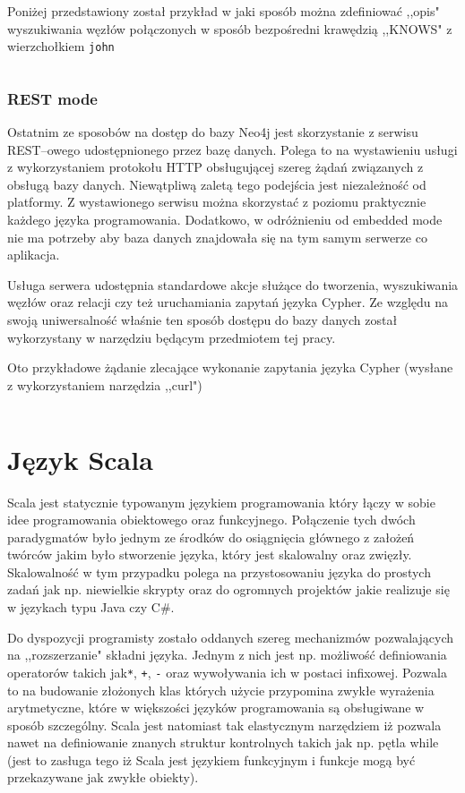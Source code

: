 \documentclass[brudnopis]{xmgr}
\begin{document}
Poniżej przedstawiony został przykład w jaki sposób można zdefiniować ,,opis" wyszukiwania węzłów połączonych w sposób bezpośredni krawędzią ,,KNOWS" z wierzchołkiem \texttt{john}

\inputminted{java}{listings/java/neo4j-traversal-api-knows.java}

\subsection{REST mode}

Ostatnim ze sposobów na dostęp do bazy Neo4j jest skorzystanie z serwisu REST--owego udostępnionego przez bazę danych. Polega to na wystawieniu usługi z wykorzystaniem protokołu HTTP obsługującej szereg żądań związanych z obsługą bazy danych. Niewątpliwą zaletą tego podejścia jest niezależność od platformy. Z wystawionego serwisu można skorzystać z poziomu praktycznie każdego języka programowania. Dodatkowo, w odróżnieniu od embedded mode nie ma potrzeby aby baza danych znajdowała się na tym samym serwerze co aplikacja.

Usługa serwera udostępnia standardowe akcje służące do tworzenia, wyszukiwania węzłów oraz relacji czy też uruchamiania zapytań języka Cypher. Ze względu na swoją uniwersalność właśnie ten sposób dostępu do bazy danych został wykorzystany w narzędziu będącym przedmiotem tej pracy.

Oto przykładowe żądanie zlecające wykonanie zapytania języka Cypher (wysłane z wykorzystaniem narzędzia ,,curl")

\inputminted{bash}{listings/bash/neo4j-rest-cypher.sh}

\chapter{Język Scala}

Scala jest statycznie typowanym językiem programowania który łączy w sobie idee programowania obiektowego oraz funkcyjnego. Połączenie tych dwóch paradygmatów było jednym ze środków do osiągnięcia głównego z założeń twórców jakim było stworzenie języka, który jest skalowalny oraz zwięzły. Skalowalność w tym przypadku polega na przystosowaniu języka do prostych zadań jak np. niewielkie skrypty oraz do ogromnych projektów jakie realizuje się w językach typu Java czy C\#.

Do dyspozycji programisty zostało oddanych szereg mechanizmów pozwalających na ,,rozszerzanie" składni języka. Jednym z nich jest np. możliwość definiowania operatorów takich jak\texttt{*}, \texttt{+}, \texttt{-} oraz wywoływania ich w postaci infixowej. Pozwala to na budowanie złożonych klas których użycie przypomina zwykłe wyrażenia arytmetyczne, które w większości języków programowania są obsługiwane w sposób szczególny. Scala jest natomiast tak elastycznym narzędziem iż pozwala nawet na definiowanie znanych struktur kontrolnych takich jak np. pętla while (jest to zasługa tego iż Scala jest językiem funkcyjnym i funkcje mogą być przekazywane jak zwykłe obiekty).
\end{document}

